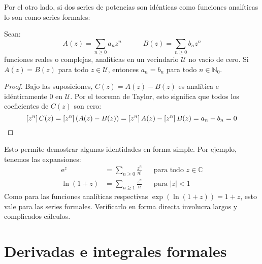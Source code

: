   Por el otro lado,
  si dos series de potencias son idénticas como funciones analíticas
  lo son como series formales:
  \begin{theorem}
    \label{theo:series-principio-transferencia}
    Sean:
    \begin{equation*}
      A(z)
	= \sum_{n \ge 0} a_n z^n
      \hspace{3em}
      B(z)
	= \sum_{n \ge 0} b_n z^n
    \end{equation*}
    funciones reales o complejas,
    analíticas en un vecindario \(\mathcal{U}\) no vacío de cero.%
    Si \(A(z) = B(z)\) para todo \(z \in \mathcal{U}\),
    entonces \(a_n = b_n\) para todo \(n \in \mathbb{N}_0\).
  \end{theorem}
  \begin{proof}
    Bajo las suposiciones,
    \(C(z) = A(z) - B(z)\) es analítica
    e idénticamente \(0\) en \(\mathcal{U}\).
    Por el teorema de Taylor,%
    esto significa que todos los coeficientes de \(C(z)\) son cero:
    \begin{equation*}
      \left[ z^n \right] C(z)
	= \left[ z^n \right] (A(z) - B(z))
	= \left[ z^n \right] A(z) - \left[ z^n \right] B(z)
	= a_n - b_n
	= 0
      \qedhere
    \end{equation*}
  \end{proof}
  Esto permite demostrar algunas identidades en forma simple.
  Por ejemplo,
  tenemos las expansiones:
  \begin{align*}
    \mathrm{e}^z
      &= \sum_{n \ge 0} \frac{z^n}{n!}
	   && \text{para todo \(z \in \mathbb{C}\)} \\
    \ln (1 + z)
      &= \sum_{n \ge 1} \frac{z^n}{n}
	   && \text{para \(\lvert z \rvert < 1\)}
  \end{align*}
  Como para las funciones analíticas respectivas
  \(\exp(\ln (1 + z)) = 1 + z\),
  esto vale para las series formales.
  Verificarlo en forma directa involucra largos y complicados cálculos.

\section{Derivadas e integrales formales}
\label{sec:series:derivadas-integrales}

